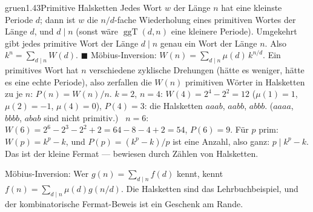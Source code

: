 \begin{loesungkarte}{gruen}{1.43}{Primitive Halsketten}
Jedes Wort $w$ der Länge $n$ hat eine kleinste Periode $d$; dann ist $w$ die $n/d$-fache Wiederholung eines primitiven Wortes der Länge $d$, und $d\mid n$ (sonst wäre $\operatorname{ggT}(d, n)$ eine kleinere Periode). Umgekehrt gibt jedes primitive Wort der Länge $d\mid n$ genau ein Wort der Länge $n$. Also $k^{n} = \sum_{d\mid n}W(d)$. $\blacksquare$
Möbius-Inversion: $W(n) = \sum_{d\mid n}\mu(d)\,k^{n/d}$. Ein primitives Wort hat $n$ verschiedene zyklische Drehungen (hätte es weniger, hätte es eine echte Periode), also zerfallen die $W(n)$ primitiven Wörter in Halsketten zu je $n$: $P(n) = W(n)/n$.
$k = 2$, $n = 4$: $W(4) = 2^{4} - 2^{2} = 12$ ($\mu(1) = 1$, $\mu(2) = -1$, $\mu(4) = 0$), $P(4) = 3$: die Halsketten $aaab$, $aabb$, $abbb$. ($aaaa$, $bbbb$, $abab$ sind nicht primitiv.) \checkmark\ $n = 6$: $W(6) = 2^{6} - 2^{3} - 2^{2} + 2 = 64 - 8 - 4 + 2 = 54$, $P(6) = 9$.
Für $p$ prim: $W(p) = k^{p} - k$, und $P(p) = (k^{p} - k)/p$ ist eine Anzahl, also ganz: $p\mid k^{p} - k$. Das ist der kleine Fermat --- bewiesen durch Zählen von Halsketten.
\begin{mitnehmen}\kastentext
Möbius-Inversion: Wer $g(n) = \sum_{d\mid n}f(d)$ kennt, kennt $f(n) = \sum_{d\mid n}\mu(d)g(n/d)$. Die Halsketten sind das Lehrbuchbeispiel, und der kombinatorische Fermat-Beweis ist ein Geschenk am Rande.
\end{mitnehmen}
\end{loesungkarte}

